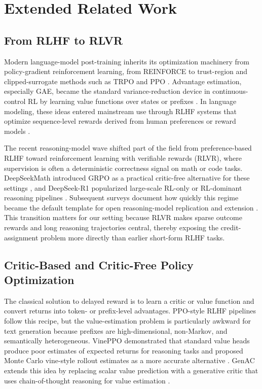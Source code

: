 \section{Extended Related Work}\label{app:extended-related-work}

\subsection{From RLHF to RLVR}

Modern language-model post-training inherits its optimization machinery from
policy-gradient reinforcement learning, from REINFORCE \cite{williams1992reinforce} to
trust-region and clipped-surrogate methods such as TRPO and PPO
\cite{schulman2015trpo,schulman2017ppo}. Advantage estimation, especially GAE, became
the standard variance-reduction device in continuous-control RL by learning value
functions over states or prefixes \cite{schulman2015gae}. In language modeling, these
ideas entered mainstream use through RLHF systems that optimize sequence-level rewards
derived from human preferences or reward models
\cite{christiano2017preferences,stiennon2020summarize,ouyang2022instruct}.

The recent reasoning-model wave shifted part of the field from preference-based RLHF
toward reinforcement learning with verifiable rewards (RLVR), where supervision is often
a deterministic correctness signal on math or code tasks. DeepSeekMath introduced GRPO
as a practical critic-free alternative for these settings \cite{shao2024deepseekmath},
and DeepSeek-R1 popularized large-scale RL-only or RL-dominant reasoning pipelines
\cite{deepseekai2025deepseekr1}. Subsequent surveys document how quickly this regime
became the default template for open reasoning-model replication and extension
\cite{zhang2025hundreddays}. This transition matters for our setting because RLVR makes
sparse outcome rewards and long reasoning trajectories central, thereby exposing the
credit-assignment problem more directly than earlier short-form RLHF tasks.

\subsection{Critic-Based and Critic-Free Policy Optimization}

The classical solution to delayed reward is to learn a critic or value function and
convert returns into token- or prefix-level advantages. PPO-style RLHF pipelines follow
this recipe, but the value-estimation problem is particularly awkward for text
generation because prefixes are high-dimensional, non-Markov, and semantically
heterogeneous. VinePPO demonstrated that standard value heads produce poor estimates of
expected returns for reasoning tasks and proposed Monte Carlo vine-style rollout
estimates as a more accurate alternative \cite{kazemnejad2024vineppo}. GenAC extends
this idea by replacing scalar value prediction with a generative critic that uses
chain-of-thought reasoning for value estimation \cite{shan2026genac}.

